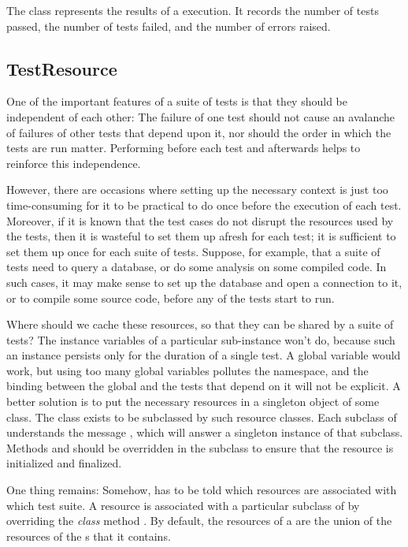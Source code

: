 \documentclass[a4paper,10pt,twoside]{book}
\begin{document}
The class  represents the results of a  execution.
It records the number of tests passed, the number of tests failed, and the number of errors raised.

\subsection{TestResource}
\label{sec:resource}

One of the important features of a suite of tests is that they should be independent of each other:
The failure of one test should not cause an avalanche of failures of other tests that depend upon it, nor should the order in which the tests are run matter.
Performing  before each test and  afterwards helps to reinforce this independence.

However, there are occasions where setting up the necessary context is just too time-consuming for it to be practical to do once before the execution of each test.
Moreover, if it is known that the test cases do not disrupt the resources used by the tests, then it is wasteful to set them up afresh for each test; it is sufficient to set them up once for each suite of tests.
Suppose, for example, that a suite of tests need to query a database, or do some analysis on some compiled code.
In such cases, it may make sense to set up the database and open a connection to it, or to compile some source code, before any of the tests start to run.

Where should we cache these resources, so that they can be shared by a suite of tests?
The instance variables of a particular  sub-instance won't do, because such an instance persists only for the duration of a single test.
A global variable would work, but using too many global variables pollutes the namespace, and the binding between the global and the tests that depend on it will not be explicit.
A better solution is to put the necessary resources in a singleton object of some class.
The class  exists to be subclassed by such resource classes.
Each subclass of  understands the message , which will answer a singleton instance of that subclass.
Methods  and  should be overridden in the subclass to ensure that the resource is initialized and finalized.

One thing remains:
Somehow, \sunit has to be told which resources are associated with which test suite.
A resource is associated with a particular subclass of  by overriding the \emph{class} method .
By default, the resources of a  are the union of the resources of the s that it contains.
\end{document}
